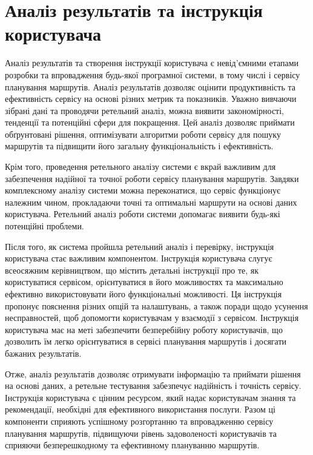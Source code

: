 \chapter{Аналіз результатів та інструкція користувача}
\label{chap:results}

Аналіз результатів та створення інструкції користувача є невід'ємними етапами розробки та впровадження будь-якої програмної системи, в тому числі і сервісу планування маршрутів. Аналіз результатів дозволяє оцінити продуктивність та ефективність сервісу на основі різних метрик та показників. Уважно вивчаючи зібрані дані та проводячи ретельний аналіз, можна виявити закономірності, тенденції та потенційні сфери для покращення. Цей аналіз дозволяє приймати обґрунтовані рішення, оптимізувати алгоритми роботи сервісу для пошуку маршрутів та підвищити його загальну функціональність і ефективність.

Крім того, проведення ретельного аналізу системи є вкрай важливим для забезпечення надійної та точної роботи сервісу планування маршрутів. Завдяки комплексному аналізу системи можна переконатися, що сервіс функціонує належним чином, прокладаючи точні та оптимальні маршрути на основі даних користувача. Ретельний аналіз роботи системи допомагає виявити будь-які потенційні проблеми.

Після того, як система пройшла ретельний аналіз і перевірку, інструкція користувача стає важливим компонентом. Інструкція користувача слугує всеосяжним керівництвом, що містить детальні інструкції про те, як користуватися сервісом, орієнтуватися в його можливостях та максимально ефективно використовувати його функціональні можливості. Ця інструкція пропонує пояснення різних опцій та налаштувань, а також поради щодо усунення несправностей, щоб допомогти користувачам у взаємодії з сервісом. Інструкція користувача має на меті забезпечити безперебійну роботу користувачів, що дозволить їм легко орієнтуватися в сервісі планування маршрутів і досягати бажаних результатів.

Отже, аналіз результатів дозволяє отримувати інформацію та приймати рішення на основі даних, а ретельне тестування забезпечує надійність і точність сервісу. Інструкція користувача є цінним ресурсом, який надає користувачам знання та рекомендації, необхідні для ефективного використання послуги. Разом ці компоненти сприяють успішному розгортанню та впровадженню сервісу планування маршрутів, підвищуючи рівень задоволеності користувачів та сприяючи безперешкодному та ефективному плануванню маршрутів.



